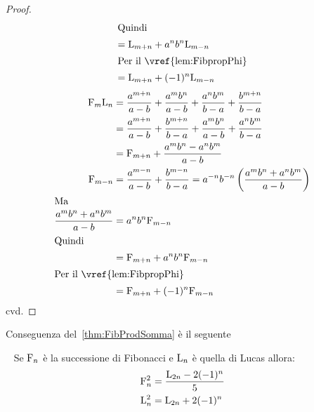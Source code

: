 \begin{proof}
\begin{align*}
		\intertext{Quindi}
		={}               & \Luc{m+n}+a^{n}b^{n}\Luc{m-n}               \\
		\intertext{Per il~\vref{lem:FibpropPhi}}
		={}               & \Luc{m+n}+(-1)^{n}\Luc{m-n}
	\end{align*}
	\begin{align*}
		\Fib{m}\Luc{n}={}             & \dfrac{a^{m+n}}{a-b}+\dfrac{a^mb^n}{a-b}+\dfrac{a^nb^m}{b-a}+\dfrac{b^{m+n}}{b-a}             \\
		={}                           & \dfrac{a^{m+n}}{a-b}+\dfrac{b^{m+n}}{b-a}+\dfrac{a^mb^n}{a-b}+\dfrac{a^nb^m}{b-a}             \\
		={}                           & \Fib{m+n}+\dfrac{a^mb^n-a^nb^m}{a-b}                                                          \\
		\Fib{m-n}={}                  & \dfrac{a^{m-n}}{a-b}+\dfrac{b^{m-n}}{b-a}=a^{-n}b^{-n}\left(\dfrac{a^mb^n+a^nb^m}{a-b}\right) \\
		\intertext{Ma}
		\dfrac{a^mb^n+a^nb^m}{a-b}={} & a^{n}b^{n}\Fib{m-n}                                                                           \\
		\intertext{Quindi}
		={}                           & \Fib{m+n}+a^{n}b^{n}\Fib{m-n}                                                                 \\
		\intertext{Per il~\vref{lem:FibpropPhi}}
		={}                           & \Fib{m+n}+(-1)^{n}\Fib{m-n}
	\end{align*}
	cvd.
\end{proof}
Conseguenza del~\vref{thm:FibProdSomma} è il seguente
\begin{cor}~\cite{Rabinowitz_1996}\label{cor:FibpotSomma}
	Se $\mathrm{F}_{n}$ è la successione di Fibonacci e  $\mathrm{L}_{n}$ è quella di Lucas allora:
	\begin{align}
		\mathrm{F}_{n}^2={} & \dfrac{\mathrm{L}_{2n}-2(-1)^n}{5}\label{eqn:FibQuadSomma} \\
		\mathrm{L}_{n}^2={} & \mathrm{L}_{2n}+2(-1)^n\label{eqn:LucQuadSomma}
	\end{align}
\end{cor}
